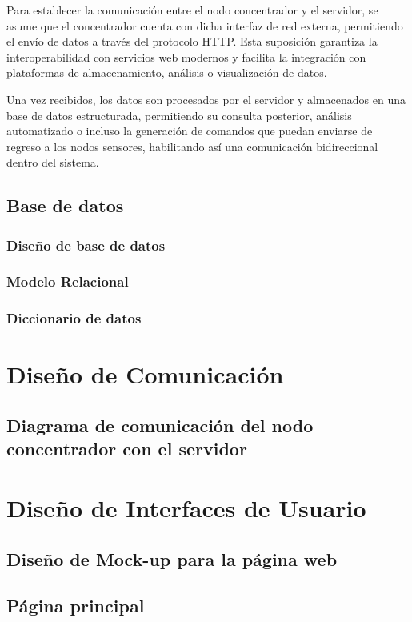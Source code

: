 Para establecer la comunicación entre el nodo concentrador y el servidor, se asume que el concentrador cuenta con dicha interfaz de red externa, permitiendo el envío de datos a través del protocolo HTTP. Esta suposición garantiza la interoperabilidad con servicios web modernos y facilita la integración con plataformas de almacenamiento, análisis o visualización de datos.

Una vez recibidos, los datos son procesados por el servidor y almacenados en una base de datos estructurada, permitiendo su consulta posterior, análisis automatizado o incluso la generación de comandos que puedan enviarse de regreso a los nodos sensores, habilitando así una comunicación bidireccional dentro del sistema.


\subsection{Base de datos}
\subsubsection{Diseño de base de datos}
\subsubsection{Modelo Relacional}
\subsubsection{Diccionario de datos}

\section{Diseño de Comunicación}
\subsection{Diagrama de comunicación del nodo concentrador con el servidor}

\section{Diseño de Interfaces de Usuario}
\subsection{Diseño de Mock-up para la página web}
\subsection{Página principal}

